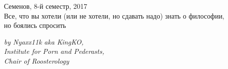 \documentclass[12pt,a4paper]{article}
\begin{document}
\begin{titlepage}
\par 
\vspace*{-2cm}
\begin{center}
{\sf \Large
\vspace*{1.5cm}
{\Huge Семенов, 8-й семестр, 2017}\\
{ Все, что вы хотели {\small(или не хотели, но сдавать надо)} знать о философии,\\ но боялись спросить}}\\
\vspace*{2cm}
\begin{flushright}
\sl\small
by Nyaxx11k aka KingKO,\\
Institute for Porn and Pederasts,\\
Chair of Roosterology
\end{flushright}
\end{center}
\end{titlepage}
\topmargin -1cm 
\hoffset -0.7in 
\textwidth 6.0in 
\textheight 9.0in 
\normalsize 
{}
\tableofcontents
\pagebreak
\end{document}
